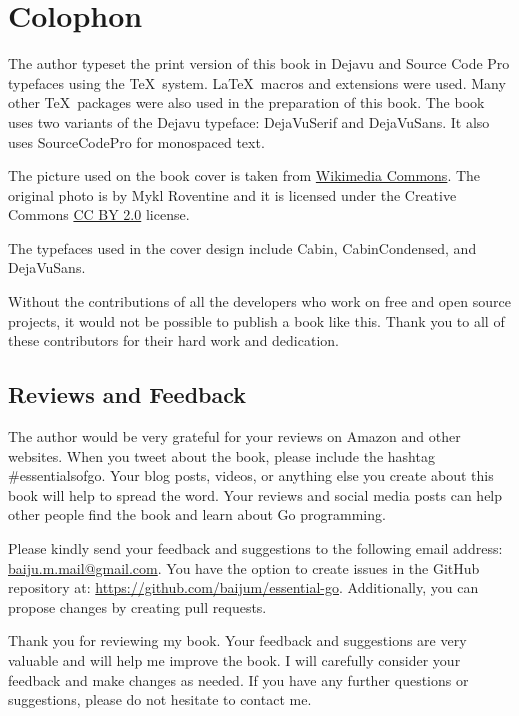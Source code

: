 \cleardoublepage
{}
\chapter*{Colophon}

The author typeset the print version of this book in Dejavu and Source Code Pro
typefaces using the \TeX\ system. \LaTeX\ macros and {}
extensions were used. Many other \TeX\ packages were also used in the
preparation of this book. The book uses two variants of the Dejavu typeface:
DejaVuSerif and DejaVuSans. It also uses SourceCodePro for monospaced text.

The picture used on the book cover is taken
from \href{https://commons.wikimedia.org/wiki/File:The_ladder_of_life_is_full_of_splinters.jpg}{Wikimedia
Commons}. The original photo is by Mykl Roventine and it is licensed under the
Creative Commons \href{https://creativecommons.org/licenses/by/2.0}{CC BY 2.0}
license.

The typefaces used in the cover design include Cabin, CabinCondensed, and
DejaVuSans.

Without the contributions of all the developers who work on free and open source
projects, it would not be possible to publish a book like this. Thank you to all
of these contributors for their hard work and dedication.

\section*{Reviews and Feedback}

The author would be very grateful for your reviews on Amazon and other websites.
When you tweet about the book, please include the hashtag \#essentialsofgo. Your
blog posts, videos, or anything else you create about this book will help to
spread the word. Your reviews and social media posts can help other people find
the book and learn about Go programming.


Please kindly send your feedback and suggestions to the following email address:
\href{mailto:baiju.m.mail@gmail.com}{baiju.m.mail@gmail.com}. You have the option
to create issues in the GitHub repository at:
\url{https://github.com/baijum/essential-go}. Additionally, you can propose changes by
creating pull requests.

Thank you for reviewing my book. Your feedback and suggestions are very valuable
and will help me improve the book. I will carefully consider your feedback and
make changes as needed. If you have any further questions or suggestions, please
do not hesitate to contact me.

